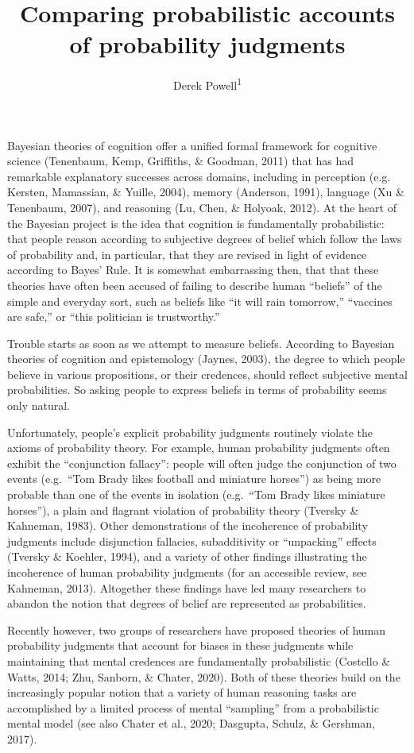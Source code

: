 \documentclass[
  english,
  man,floatsintext]{apa6}
\title{Comparing probabilistic accounts of probability judgments}
\author{Derek Powell\textsuperscript{1}}
\date{}
\affiliation{\vspace{0.5cm}\textsuperscript{1} Arizona State University, School of Social and Behavioral Sciences}
\begin{document}
\maketitle

Bayesian theories of cognition offer a unified formal framework for cognitive science (Tenenbaum, Kemp, Griffiths, \& Goodman, 2011) that has had remarkable explanatory successes across domains, including in perception (e.g. Kersten, Mamassian, \& Yuille, 2004), memory (Anderson, 1991), language (Xu \& Tenenbaum, 2007), and reasoning (Lu, Chen, \& Holyoak, 2012). At the heart of the Bayesian project is the idea that cognition is fundamentally probabilistic: that people reason according to subjective degrees of belief which follow the laws of probability and, in particular, that they are revised in light of evidence according to Bayes' Rule. It is somewhat embarrassing then, that that these theories have often been accused of failing to describe human ``beliefs'' of the simple and everyday sort, such as beliefs like ``it will rain tomorrow,'' ``vaccines are safe,'' or ``this politician is trustworthy.''

Trouble starts as soon as we attempt to measure beliefs. According to Bayesian theories of cognition and epistemology (Jaynes, 2003), the degree to which people believe in various propositions, or their credences, should reflect subjective mental probabilities. So asking people to express beliefs in terms of probability seems only natural.

Unfortunately, people's explicit probability judgments routinely violate the axioms of probability theory. For example, human probability judgments often exhibit the ``conjunction fallacy'': people will often judge the conjunction of two events (e.g.~``Tom Brady likes football and miniature horses'') as being more probable than one of the events in isolation (e.g.~``Tom Brady likes miniature horses''), a plain and flagrant violation of probability theory (Tversky \& Kahneman, 1983). Other demonstrations of the incoherence of probability judgments include disjunction fallacies, subadditivity or ``unpacking'' effects (Tversky \& Koehler, 1994), and a variety of other findings illustrating the incoherence of human probability judgments (for an accessible review, see Kahneman, 2013). Altogether these findings have led many researchers to abandon the notion that degrees of belief are represented as probabilities.

Recently however, two groups of researchers have proposed theories of human probability judgments that account for biases in these judgments while maintaining that mental credences are fundamentally probabilistic (Costello \& Watts, 2014; Zhu, Sanborn, \& Chater, 2020). Both of these theories build on the increasingly popular notion that a variety of human reasoning tasks are accomplished by a limited process of mental ``sampling'' from a probabilistic mental model (see also Chater et al., 2020; Dasgupta, Schulz, \& Gershman, 2017).
\end{document}
